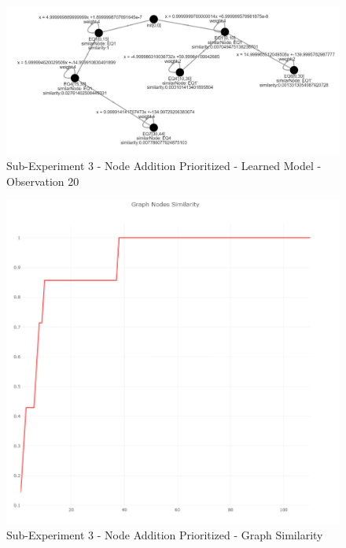 \begin{figure}[h]
	\centering
	\includegraphics[scale=0.4]{./pictures/addition_experiment/learnedModel_Obs20.png}
	\caption{Sub-Experiment 3 - Node Addition Prioritized - Learned Model - Observation 20}
	\label{addition_experiment_sim_1}
\end{figure}

\newpage

\begin{figure}[h]
	\centering
	\includegraphics[scale=0.7]{./pictures/addition_experiment/similarity.png}
	\caption{Sub-Experiment 3 - Node Addition Prioritized - Graph Similarity}
	\label{addition_experiment_sim}
\end{figure}
%
\newpage

